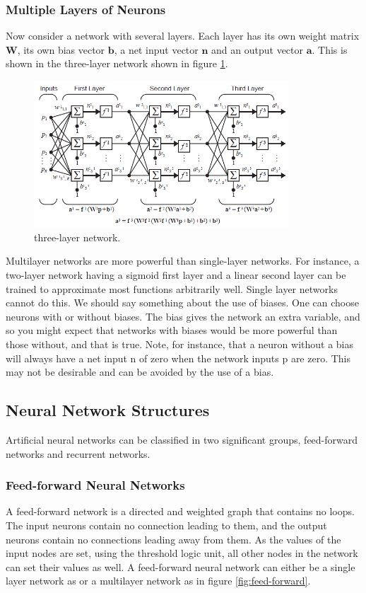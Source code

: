 \documentclass[12pt, a4paper, twoside]{report}
\begin{document}
\subsubsection{Multiple Layers of Neurons}
Now consider a network with several layers. Each layer has its own weight matrix $\mathbf{W}$, its own bias vector $\mathbf{b}$, a net input vector $\mathbf{n}$ and an output vector $\mathbf{a}$. This is shown in the three-layer network shown in figure \ref{fig:three_layer_network}.
\begin{figure}[!h]
	\centering
	\includegraphics[width=0.85\textwidth]
	{images/chapter4/three_layer_network}
	\caption{three-layer network.}
	\label{fig:three_layer_network}
\end{figure}

Multilayer networks are more powerful than single-layer networks. For instance, a two-layer network having a sigmoid first layer and a linear second layer can be trained to approximate most functions arbitrarily well. Single layer networks cannot do this. We should say something about the use of biases. One can choose neurons with or without biases. The bias gives the network an extra variable, and so you might expect that networks with biases would be more powerful than those without, and that is true. Note, for instance, that a neuron without a bias will always have a net input n of zero when the network inputs p are zero. This may not be desirable and can be avoided by the use of a bias.

\subsection{Neural Network Structures}
Artificial neural networks can be classified in two significant groups, feed-forward networks and recurrent networks.
\subsubsection{Feed-forward Neural Networks}
A feed-forward network is a directed and weighted graph that contains no loops. The input neurons contain no connection leading to them, and the output neurons contain no connections leading away from them. As the values of the input nodes are set, using the threshold logic unit, all other nodes in the network can set their values as well. A feed-forward neural network can either be a single layer network as or a multilayer network as in figure \ref{fig:feed-forward}.
\end{document}
